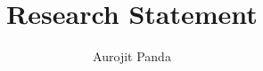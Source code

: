 \documentclass[letterpaper]{article}
\begin{document}
\title{\Large Research Statement}
\author{Aurojit Panda}
\date{}
\thispagestyle{empty}
\maketitle



\end{document}
